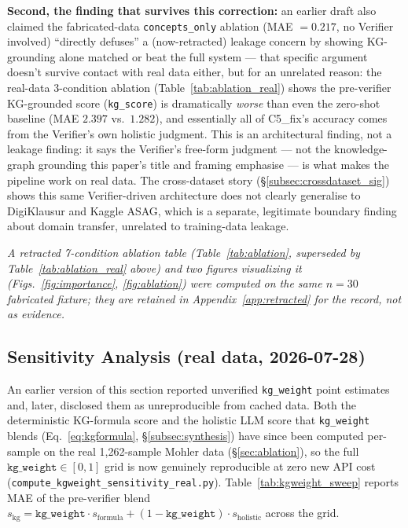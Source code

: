 \documentclass[conference]{IEEEtran}
\begin{document}
\textbf{Second, the finding that survives this correction:} an earlier
draft also claimed the fabricated-data \texttt{concepts\_only} ablation
(MAE $=0.217$, no Verifier involved) ``directly defuses'' a (now-retracted)
leakage concern by showing KG-grounding alone matched or beat the full
system --- that specific argument doesn't survive contact with real data
either, but for an unrelated reason: the real-data 3-condition ablation
(Table~\ref{tab:ablation_real}) shows the pre-verifier KG-grounded score
(\texttt{kg\_score}) is dramatically \emph{worse} than even the
zero-shot baseline (MAE $2.397$ vs.\ $1.282$), and essentially all of
C5\_fix's accuracy comes from the Verifier's own holistic judgment. This
is an architectural finding, not a leakage finding: it says the
Verifier's free-form judgment --- not the knowledge-graph grounding this
paper's title and framing emphasise --- is what makes the pipeline work
on real data. The cross-dataset story (\S\ref{subsec:crossdataset_sig})
shows this same Verifier-driven architecture does not clearly generalise
to DigiKlausur and Kaggle ASAG, which is a separate, legitimate boundary
finding about domain transfer, unrelated to training-data leakage.

\textit{A retracted 7-condition ablation table (Table~\ref{tab:ablation},
superseded by Table~\ref{tab:ablation_real} above) and two figures
visualizing it (Figs.~\ref{fig:importance}, \ref{fig:ablation}) were
computed on the same $n=30$ fabricated fixture; they are retained in
Appendix~\ref{app:retracted} for the record, not as evidence.}


\subsection{Sensitivity Analysis (real data, 2026-07-28)}

An earlier version of this section reported unverified \texttt{kg\_weight}
point estimates and, later, disclosed them as unreproducible from cached
data. Both the deterministic KG-formula score and the holistic LLM score
that \texttt{kg\_weight} blends (Eq.~\ref{eq:kgformula}, \S\ref{subsec:synthesis})
have since been computed per-sample on the real 1{,}262-sample Mohler data
(\S\ref{sec:ablation}), so the full $\texttt{kg\_weight}\in[0,1]$ grid is
now genuinely reproducible at zero new API cost
(\texttt{compute\_kgweight\_sensitivity\_real.py}). Table~\ref{tab:kgweight_sweep}
reports MAE of the pre-verifier blend $s_{\text{kg}} = \texttt{kg\_weight}\cdot
s_{\text{formula}} + (1-\texttt{kg\_weight})\cdot s_{\text{holistic}}$ across
the grid.
\end{document}
